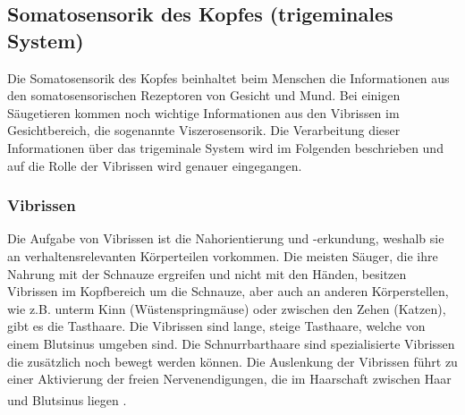 \documentclass[12pt,a4paper,pdftex]{article}
\begin{document}
\newpage
\subsection{Somatosensorik des Kopfes (trigeminales System)}
\label{sec:somatokopf}
Die Somatosensorik des Kopfes beinhaltet beim Menschen die Informationen aus den somatosensorischen Rezeptoren von Gesicht und Mund. Bei einigen Säugetieren kommen noch wichtige Informationen aus den Vibrissen im Gesichtbereich, die sogenannte Viszerosensorik. Die Verarbeitung dieser Informationen über das trigeminale System wird im Folgenden beschrieben und auf die Rolle der Vibrissen wird genauer eingegangen.

\subsubsection*{Vibrissen}
Die Aufgabe von Vibrissen ist die Nahorientierung und -erkundung, weshalb sie an verhaltensrelevanten Körperteilen vorkommen. Die meisten Säuger, die ihre Nahrung mit der Schnauze ergreifen und nicht mit den Händen, besitzen Vibrissen im Kopfbereich um die Schnauze, aber auch an anderen Körperstellen, wie z.B. unterm Kinn (Wüstenspringmäuse) oder zwischen den Zehen (Katzen), gibt es die Tasthaare. Die Vibrissen sind lange, steige Tasthaare, welche von einem Blutsinus umgeben sind. Die Schnurrbarthaare sind spezialisierte Vibrissen die zusätzlich noch bewegt werden können. 
Die Auslenkung der Vibrissen führt zu einer Aktivierung der freien Nervenendigungen, die im Haarschaft zwischen Haar und Blutsinus liegen \textsuperscript{\cite[5]{heldmaier2003tierphysiologie}}.
\end{document}
